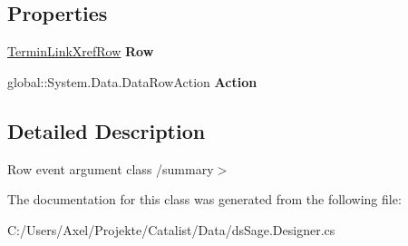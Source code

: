 \subsection*{Properties}
\begin{DoxyCompactItemize}
\item 
\hyperlink{class_products_1_1_data_1_1ds_sage_1_1_termin_link_xref_row}{Termin\+Link\+Xref\+Row} {\bfseries Row}\hypertarget{class_products_1_1_data_1_1ds_sage_1_1_termin_link_xref_row_change_event_ac70eaaa11caf9e43d7ed8d8967c43110}{}\label{class_products_1_1_data_1_1ds_sage_1_1_termin_link_xref_row_change_event_ac70eaaa11caf9e43d7ed8d8967c43110}

\item 
global\+::\+System.\+Data.\+Data\+Row\+Action {\bfseries Action}\hypertarget{class_products_1_1_data_1_1ds_sage_1_1_termin_link_xref_row_change_event_adbcbd3991fc1a408165ecf9ece68c1d2}{}\label{class_products_1_1_data_1_1ds_sage_1_1_termin_link_xref_row_change_event_adbcbd3991fc1a408165ecf9ece68c1d2}

\end{DoxyCompactItemize}


\subsection{Detailed Description}
Row event argument class /summary$>$ 

The documentation for this class was generated from the following file\+:\begin{DoxyCompactItemize}
\item 
C\+:/\+Users/\+Axel/\+Projekte/\+Catalist/\+Data/ds\+Sage.\+Designer.\+cs\end{DoxyCompactItemize}
